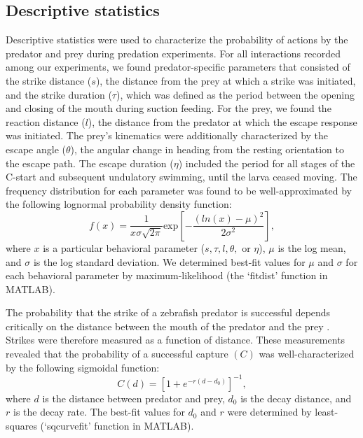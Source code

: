 \documentclass[]{rsos}%
\begin{document}
\subsection{Descriptive statistics}

Descriptive statistics were used to characterize the probability of actions by the predator and prey during predation experiments.
For all interactions recorded among our experiments, we found predator-specific parameters that consisted of the strike distance ($s$), the distance from the prey at which a strike was initiated, and the strike duration ($\tau$), which was defined as the period between the opening and closing of the mouth during suction feeding. 
For the prey, we found the reaction distance ($l$), the distance from the predator at which the escape response was initiated.
The prey's kinematics were additionally characterized by the escape angle ($\theta$), the angular change in heading from the resting orientation to the escape path.
The escape duration ($\eta$) included the period for all stages of the C-start and subsequent undulatory swimming, until the larva ceased moving.
The frequency distribution for each parameter was found to be well-approximated by the following lognormal probability density function:
%
\begin{equation}%
f(x) = \frac{1}{x\sigma \sqrt{2 \pi}} \text{exp} \left[ -{\frac{(ln(x)-\mu)^2}{2\sigma ^2}} \right],
\label{eqn_lognorm}
\end{equation}
%
where $x$ is a particular behavioral parameter ($s, \tau, l, \theta ,$ or $\eta$), $\mu$ is the log mean, and $\sigma$ is the log standard deviation. 
We determined best-fit values for $\mu$ and $\sigma$ for each behavioral parameter by maximum-likelihood (the `fitdist' function in MATLAB).

The probability that the strike of a zebrafish predator is successful depends critically on the distance between the mouth of the predator and the prey \cite{Stewart:2013bha}.
Strikes were therefore measured as a function of distance. 
These measurements revealed that the probability of a successful capture $(C)$ was well-characterized by the following sigmoidal function:
%
\begin{equation}%
C(d) = \left[ 1+e^{-r(d-d_0)} \right]^{-1},
\label{eqn_sig} 
\end{equation}
%
where $d$ is the distance between predator and prey, $d_0$ is the decay distance, and $r$ is the decay rate. 
The best-fit values for $d_0$ and $r$ were determined by least-squares (`sqcurvefit' function in MATLAB).
\end{document}
